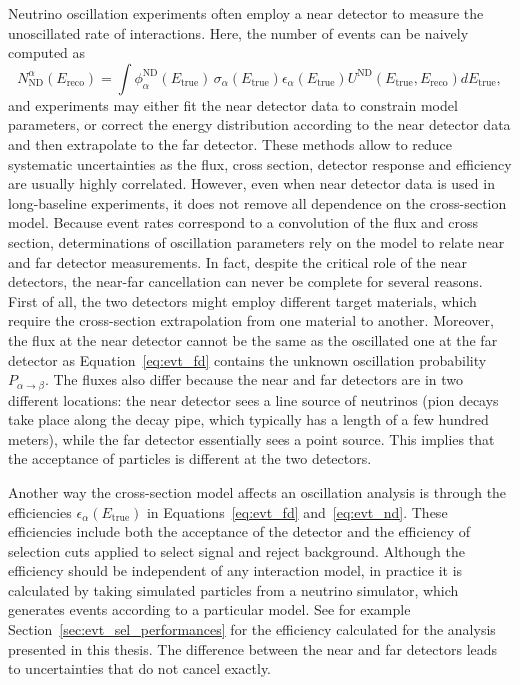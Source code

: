Neutrino oscillation experiments often employ a near detector to measure the unoscillated rate of interactions. Here, the number of events can be naively computed as
\begin{equation}
\label{eq:evt_nd}
N^{\alpha}_\text{ND} (E_\text{reco}) = \int \phi_\alpha^\text{ND}(E_\text{true})\, \sigma_\alpha(E_\text{true}) \epsilon_\alpha(E_\text{true}) U^\text{ND}(E_\text{true}, E_\text{reco}) dE_\text{true},
\end{equation}
and experiments may either fit the near detector data to constrain model parameters, or correct the energy distribution according to the near detector data and then extrapolate to the far detector. These methods allow to reduce systematic uncertainties as the flux, cross section, detector response and efficiency are usually highly correlated.
However, even when near detector data is used in long-baseline experiments, it does not remove all dependence on the cross-section model. Because event rates correspond to a convolution of the flux and cross section, determinations of oscillation parameters rely on the model to relate near and far detector measurements.
In fact, despite the critical role of the near detectors, the near-far cancellation can never be complete for several reasons. 
First of all, the two detectors might employ different target materials, which require the cross-section extrapolation from one material to another. Moreover, the flux at the near detector cannot be the same as the oscillated one at the far detector as Equation~\eqref{eq:evt_fd} contains the unknown oscillation probability $P_{\alpha\rightarrow\beta}$. The fluxes also differ because the near and far detectors are in two different locations: the near detector sees a line source of neutrinos (pion decays take place along the decay pipe, which typically has a length of a few hundred meters), while the far detector essentially sees a point source. This implies that the acceptance of particles is different at the two detectors.

Another way the cross-section model affects an oscillation analysis is through the efficiencies $\epsilon_\alpha(E_\text{true})$ in Equations~\eqref{eq:evt_fd} and~\eqref{eq:evt_nd}. These efficiencies include both the acceptance of the detector and the efficiency of selection cuts applied to select signal and reject background. Although the efficiency should be independent of any interaction model, in practice it is calculated by taking simulated particles from a neutrino simulator, which generates events according to a particular model. See for example Section~\ref{sec:evt_sel_performances} for the efficiency calculated for the analysis presented in this thesis.
The difference between the near and far detectors leads to uncertainties that do not cancel exactly. 



